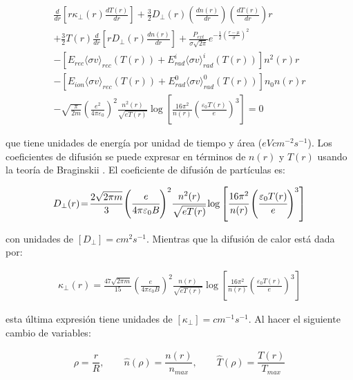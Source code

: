 \begin{eqnarray}\label{eq:energy}
	\frac{d}{dr}\left[r\kappa_\perp(r) \frac{dT(r)}{dr}\right]+ \frac{3}{2}D_\perp(r)\left(\frac{dn(r)}{dr}\right)\left(\frac{dT(r)}{dr}\right)r \nonumber\\
	+ \frac{3}{2}T(r)\frac{d}{dr}\left[rD_\perp(r) \frac{dn(r)}{dr}\right] + \frac{P_{ext}}{\sigma \sqrt{2\pi}}e^{-\frac{1}{2}\left(\frac{r - \mu}{\sigma}\right)^2} \nonumber\\
	- [E_{rec}\langle\sigma v\rangle_{rec}( T(r) ) + E_{rad}^i\langle\sigma v\rangle_{rad}^i( T(r) )]n^2(r) r \nonumber\\ 
	- [E_{ion}\langle\sigma v\rangle_{rec}( T(r) ) + E_{rad}^0\langle\sigma v\rangle_{rad}^0( T(r) )]n_0n(r)r \nonumber\\ 
	- \sqrt{\frac{\pi}{2m}}\!\left(\frac{e^2}{4\pi\varepsilon_0}\right)^2\!\frac{n^2(r)}{\sqrt{eT(r)}}\!\log\!{\left[\frac{16\pi^2}{n(r)}\!\left(\frac{\varepsilon_0T(r)}{e}\right)^3\!\right]} = 0
\end{eqnarray}

que tiene unidades de energía por unidad de tiempo y área ($eV cm^{-2}s^{-1}$). Los coeficientes de difusión se puede expresar en términos de $n(r)$ y $T(r)$ usando la teoría de Braginskii \cite{helander2005}. El coeficiente de difusión de partículas es:

{\small\begin{eqnarray}\label{eq:Dperp}
	D_\perp(r)\!=\!\frac{2\sqrt{2\pi m}}{3}\!\left(\cfrac{e}{4\pi \varepsilon_0 B}\right)^2\!\cfrac{n^2(r)}{\sqrt{eT(r)}}\log{\left[\cfrac{16\pi^2}{n(r)} \left(\cfrac{\varepsilon_0T(r)}{e}\right)^3\right]} 
\end{eqnarray}}

con unidades de $[D_\perp] = cm^2 s^{-1}$. Mientras que la difusión de calor está dada por:

{\small \begin{eqnarray}\label{eq:kperp}
	\kappa_\perp(r)\!=\!\frac{47\sqrt{2\pi m}}{15}\!\left(\frac{e}{4\pi \varepsilon_0 B}\right)^2\!\frac{n(r)}{\sqrt{eT(r)}}\!\log{\left[\frac{16\pi^2}{n(r)}\!\left(\frac{\varepsilon_0T(r)}{e}\right)^3\right]} 
\end{eqnarray}}

esta última expresión tiene unidades de  $[\kappa_\perp] = cm^{-1} s^{-1}$. Al hacer el siguiente cambio de variables:

\begin{eqnarray}
	\rho = \dfrac{r}{R}, \quad \quad \hat{n}(\rho) = \dfrac{n(r)}{n_{max}} , \quad \quad \hat{T}(\rho) = \dfrac{T(r)}{T_{max}}	
\end{eqnarray}

